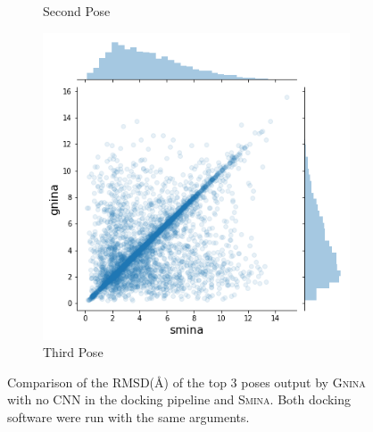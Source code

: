 \documentclass[journal=jcisd8,manuscript=article]{achemso}
\begin{document}
\begin{figure}
\begin{subfigure}[b]{0.32\textwidth}
        \caption{Second Pose}
        \label{fig:SminaCompareTwo}
    \end{subfigure}
    \begin{subfigure}[b]{0.32\textwidth}
        \centering
        \includegraphics[width=\textwidth]{figures/other/thirdpose.png}
        \caption{Third Pose}
        \label{fig:SminaComparePose}
    \end{subfigure}
    \caption{Comparison of the RMSD(\AA) of the top 3 poses output by \textsc{Gnina} with no CNN in the docking pipeline and \textsc{Smina}. Both docking software were run with the same arguments.}
    \label{fig:SminaComparePose}
\end{figure}
\end{document}

